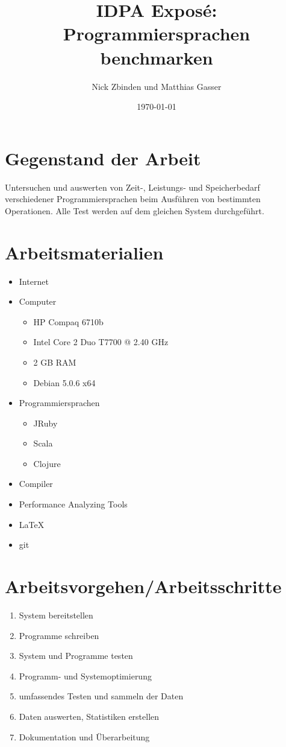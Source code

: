 \documentclass{fancydocument}
\title{IDPA Exposé: Programmiersprachen benchmarken}
\author{Nick Zbinden und Matthias Gasser}
\date{\today}
\begin{document}
\maketitle
\thispagestyle{fancy}

\section*{Gegenstand der Arbeit}
Untersuchen und auswerten von Zeit-, Leistungs- und Speicherbedarf
verschiedener Programmiersprachen beim Ausführen von bestimmten
Operationen. 
Alle Test werden auf dem gleichen System durchgeführt. 

\section*{Arbeitsmaterialien}
\begin{itemize}
	\item Internet
	\item Computer
	\begin{itemize}
		\item HP Compaq 6710b
		\item Intel Core 2 Duo T7700 @ 2.40 GHz
		\item 2 GB RAM
		\item Debian 5.0.6 x64
	\end{itemize}
	\item Programmiersprachen
	\begin{itemize}
		\item JRuby
		\item Scala
		\item Clojure
	\end{itemize}
	\item Compiler
	\item Performance Analyzing Tools
	\item LaTeX
	\item git
\end{itemize}

\section*{Arbeitsvorgehen/Arbeitsschritte}
\begin{enumerate}
	\item System bereitstellen
	\item Programme schreiben
	\item System und Programme testen
	\item Programm- und Systemoptimierung
	\item umfassendes Testen und sammeln der Daten
	\item Daten auswerten, Statistiken erstellen
	\item Dokumentation und Überarbeitung
\end{enumerate}
\end{document}
